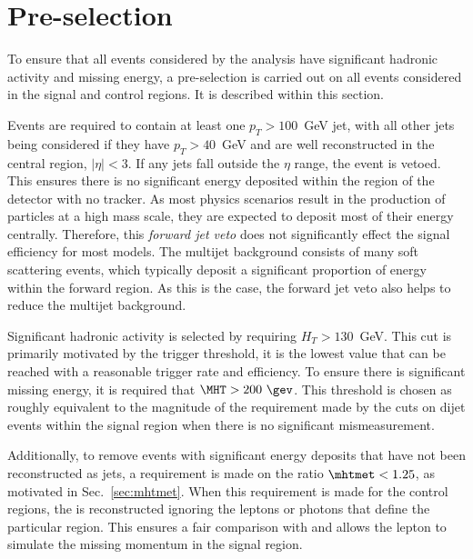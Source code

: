 \section{Pre-selection}%
\label{sec:preselection}

To ensure that all events considered by the analysis have
significant hadronic activity and missing energy, a pre-selection is
carried out on all events considered in the signal and control
regions. It is described within this section.

Events are required to contain at least one $p_T>100$~GeV jet,
with all other jets being considered if they have $p_T>40$~GeV and are
well reconstructed in the central region, $|\eta|<3$. If any jets
fall outside the $\eta$ range, the event is vetoed. This ensures there
is no significant energy deposited within the region of the detector
with no tracker. As most \BSM physics scenarios result in the
production of particles at a high mass scale, they are expected to deposit
most of their energy centrally. Therefore, this \emph{forward jet
veto} does not significantly effect the signal efficiency for most
models. The \QCD multijet background consists of many
soft scattering events, which typically deposit a significant
proportion of energy within the forward region. As this is the case,
the forward jet veto also helps to reduce the multijet
background.

Significant hadronic activity is selected by requiring $H_T>130$~GeV.
This cut is primarily motivated by the trigger threshold, it is the
lowest \HT value that can be reached with a reasonable trigger rate
and efficiency. To ensure there is significant missing energy, it is
required that $\MHT>200~\gev$.  This threshold is chosen as roughly
equivalent to the magnitude of the \MHT requirement made by the
\alphat cuts on dijet events within the signal region when there is no
significant mismeasurement. 

Additionally, to remove events with significant energy deposits that
have not been reconstructed as jets, a requirement is made on the
ratio $\mhtmet<1.25$, as motivated in Sec.~\ref{sec:mhtmet}.  When
this requirement is made for the control regions, the \MET is
reconstructed ignoring the leptons or photons that define the
particular region. This ensures a fair comparison with \MHT and allows
the lepton to simulate the missing momentum in the 
signal region.

